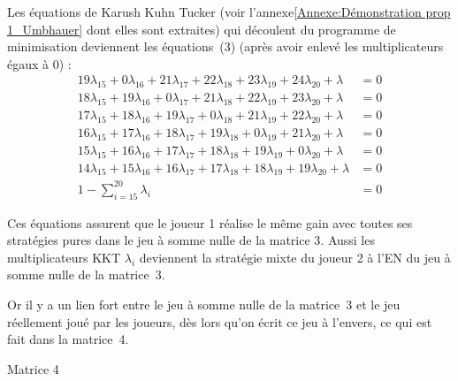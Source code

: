 \begin{Article}
\begin{refsection}[UmbhauerFR]
Les équations de Karush Kuhn Tucker (voir l'annexe\ref{Annexe:Démonstration prop 1_Umbhauer} dont elles sont
extraites) qui découlent du programme de minimisation deviennent les
équations~(3) (après avoir enlevé les multiplicateurs égaux à 0) :
%
\begin{align*}
19\lambda_{15} + 0\lambda_{16} + 21\lambda_{17} + 22\lambda_{18} + 23\lambda_{19} + 24\lambda_{20} + \lambda &= 0 \\
18\lambda_{15} + 19\lambda_{16} + 0\lambda_{17} + 21\lambda_{18} + 22\lambda_{19} + 23\lambda_{20} + \lambda &= 0 \\
17\lambda_{15} + 18\lambda_{16} + 19\lambda_{17} + 0\lambda_{18} + 21\lambda_{19} + 22\lambda_{20} + \lambda &= 0 \\ \tag{3}
16\lambda_{15} + 17\lambda_{16} + 18\lambda_{17} + 19\lambda_{18} + 0\lambda_{19} + 21\lambda_{20} + \lambda &= 0 \\
15\lambda_{15} + 16\lambda_{16} + 17\lambda_{17} + 18\lambda_{18} + 19\lambda_{19} + 0\lambda_{20} + \lambda &= 0 \\
14\lambda_{15} + 15\lambda_{16} + 16\lambda_{17} + 17\lambda_{18} + 18\lambda_{19} + 19\lambda_{20} + \lambda &= 0 \\
1 - \sum_{i = 15}^{20}{\lambda_{i}} &= 0
\end{align*}

Ces équations assurent que le joueur 1 réalise le même gain avec toutes
ses stratégies pures dans le jeu à somme nulle de la matrice 3. Aussi
les multiplicateurs KKT $\lambda_i$ deviennent la
stratégie mixte du joueur 2 à l'EN du jeu à somme nulle de la matrice~3.

Or il y a un lien fort entre le jeu à somme nulle de la matrice~3 et le
jeu réellement joué par les joueurs, dès lors qu'on écrit ce jeu à
l'envers, ce qui est fait dans la matrice~4.

\begin{table}[h!]
\centering
Matrice 4\par
\vspace{0.2cm}
\label{matrice4}
\end{table}


\end{refsection}
\end{Article}
